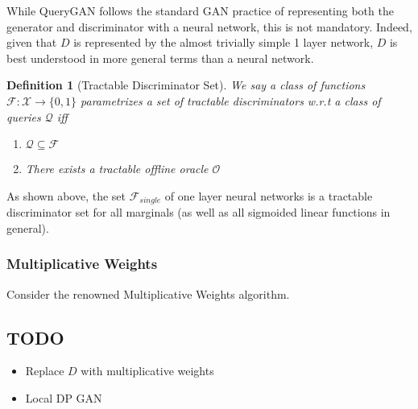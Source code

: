 \documentclass[]{article}
\newcommand{\X}{\mathcal{X}}
\newcommand{\Q}{\mathcal{Q}}
\newcommand{\B}{\{0,1\}}
\newtheorem{definition}{Definition}
\begin{document}
While QueryGAN follows the standard GAN practice of representing both the generator and discriminator with a neural network, this is not mandatory. Indeed, given that $D$ is represented by the almost trivially simple 1 layer network, $D$ is best understood in more general terms than a neural network.

\begin{definition}[Tractable Discriminator Set]
    We say a class of functions $\mathcal{F}: \X \to \B$ parametrizes a set of tractable discriminators w.r.t a class of queries $\Q$ iff

    \begin{enumerate}
        \item $\Q \subseteq \mathcal{F}$
        \item There exists a tractable offline oracle $\mathcal{O}$ 
    \end{enumerate}
\end{definition}

As shown above, the set $\mathcal{F}_{single}$ of one layer neural networks is a tractable discriminator set for all marginals (as well as all sigmoided linear functions in general).

\subsubsection{Multiplicative Weights}

Consider the renowned Multiplicative Weights algorithm. 

\subsection{TODO}
\begin{itemize}
    \item Replace $D$ with multiplicative weights
    \item Local DP GAN
\end{itemize}





\newpage

\appendix
\end{document}
